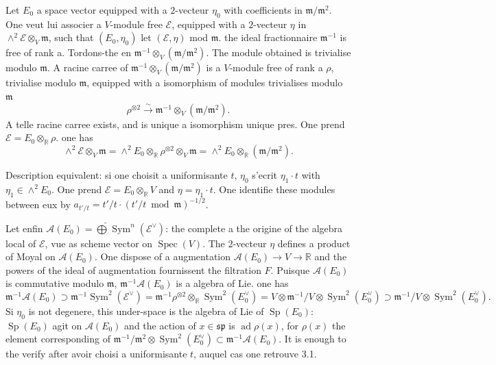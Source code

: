 \documentclass[11pt,a4paper]{article}
\theoremstyle{plain}
\theoremstyle{definition}
\DeclareMathOperator{\Spec}{Spec}
\DeclareMathOperator{\ad}{ad}
\DeclareMathOperator{\Sp}{Sp}
\DeclareMathOperator{\Sym}{Sym}
\newcommand{\R}{\mathbb{R}}
\newcommand{\iso}{\xrightarrow{\sim}}
\begin{document}
Let $E_{0}$ a space vector equipped with a $2$-vecteur $\eta_{0}$ with coefficients in $\mathfrak{m}/\mathfrak{m}^{2}$.
One veut lui associer a $V$-module free $\mathcal{E}$, equipped with a $2$-vecteur $\eta$ in $\wedge^{2} \mathcal{E} \otimes_{V} \mathfrak{m}$, such that $(E_{0}, \eta_{0})$ let $(\mathcal{E}, \eta)$ mod $\mathfrak{m}$. the ideal fractionnaire $\mathfrak{m}^{-1}$ is free of rank a.
Tordons-the en $\mathfrak{m}^{-1} \otimes_{V} (\mathfrak{m}/\mathfrak{m}^{2})$. The module obtained is trivialise modulo $\mathfrak{m}$. A racine carree of $\mathfrak{m}^{-1} \otimes_{V} (\mathfrak{m}/\mathfrak{m}^{2})$ is a $V$-module free of rank a $\rho$, trivialise modulo $\mathfrak{m}$, equipped with a isomorphism of modules trivialises modulo $\mathfrak{m}$
\[
\rho^{\otimes 2} \iso \mathfrak{m}^{-1} \otimes_{V} (\mathfrak{m}/\mathfrak{m}^{2}).
\]
A telle racine carree exists, and is unique a isomorphism unique pres. One prend $\mathcal{E} = E_{0} \otimes_{\R} \rho$. one has
\[
\wedge^{2}\mathcal{E} \otimes_{V} \mathfrak{m} = \wedge^{2} E_{0} \otimes_{\R} \rho^{\otimes 2} \otimes_{V} \mathfrak{m} = \wedge^{2} E_{0} \otimes_{\R} (\mathfrak{m}/\mathfrak{m}^{2}).
\]

Description equivalent: si one choisit a uniformisante $t$, $\eta_{0}$ s'ecrit $\eta_{1} \cdot t$ with
$\eta_{1} \in \wedge^{2} E_{0}$. One prend $\mathcal{E} = E_{0} \otimes_{\R} V$ and $\eta = \eta_{1} \cdot t$. One identifie these modules between eux by $a_{t'/t} = t'/t \cdot (t'/t \bmod \mathfrak{m})^{-1/2}$.

Let enfin $\mathcal{A}(E_{0}) = \widehat{\bigoplus} \Sym^{n}(\mathcal{E}^{\vee})$: the complete a the origine of the algebra local of $\mathcal{E}$, vue as scheme vector on $\Spec(V)$. The $2$-vecteur $\eta$ defines a product of Moyal on $\mathcal{A}(E_{0})$. One dispose of a augmentation $\mathcal{A}(E_{0}) \to V \to \R$ and the powers of the ideal of augmentation fournissent the filtration $F$. Puisque $\mathcal{A}(E_{0})$ is commutative modulo $\mathfrak{m}$, $\mathfrak{m}^{-1}\mathcal{A}(E_{0})$ is a algebra of Lie. one has
\[
\mathfrak{m}^{-1}\mathcal{A}(E_{0}) \supset \mathfrak{m}^{-1}\Sym^{2}(\mathcal{E}^{\vee}) = \mathfrak{m}^{-1}\rho^{\otimes 2} \otimes_{\R} \Sym^{2}(E_{0}^{\vee}) = V \otimes \mathfrak{m}^{-1}/V \otimes \Sym^{2}(E_{0}^{\vee}) \supset \mathfrak{m}^{-1}/V \otimes \Sym^{2}(E_{0}^{\vee}).
\]
Si $\eta_{0}$ is not degenere, this under-space is the algebra of Lie of $\Sp(E_{0})$: $\Sp(E_{0})$ agit
on $\mathcal{A}(E_{0})$ and the action of $x \in \mathfrak{sp}$ is $\ad \rho(x)$, for $\rho(x)$ the element corresponding of $\mathfrak{m}^{-1}/\mathfrak{m}^{2} \otimes \Sym^{2}(E_{0}^{\vee}) \subset \mathfrak{m}^{-1}\mathcal{A}(E_{0})$. It is enough to the verify after avoir choisi a uniformisante $t$, auquel cas one retrouve 3.1.
\end{document}
